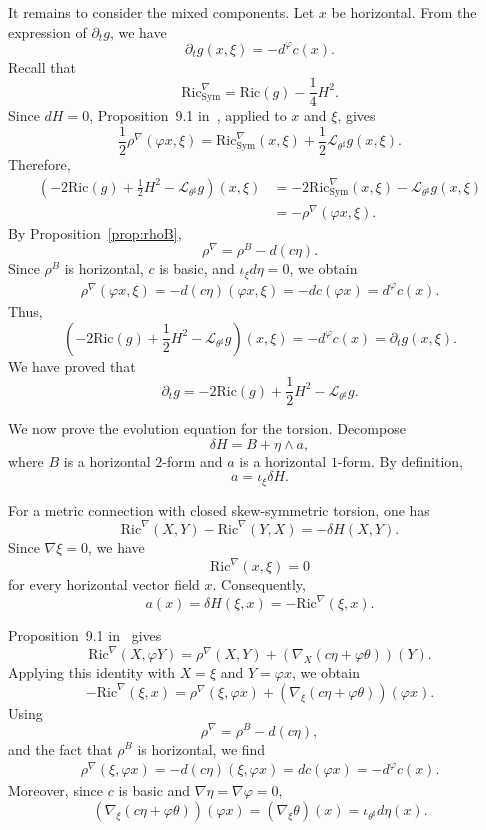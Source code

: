 \documentclass{article}
\makeatletter
\renewenvironment{proof}[1][\proofname]{%
  \par\pushQED{\qed}%
  \normalfont\topsep6\p@\@plus6\p@\relax
  \trivlist
  \item[\hskip\labelsep
        \textbf{\textup{#1}}\@addpunct{.}]\ignorespaces
}{%
  \popQED\endtrivlist\@endpefalse
}
\theoremstyle{definition}
\newcommand{\Ric}{\mathrm{Ric}}
\renewcommand{\phi}{\varphi}
\numberwithin{equation}{section}
\makeatother
\begin{document}
\begin{proof}
It remains to consider the mixed components. Let $x$ be horizontal. From the expression of $\partial_tg$, we have
\[
\partial_tg(x,\xi)
=
-d^\phi c(x).
\]
Recall that
\[
\Ric^\nabla_{\mathrm{Sym}}
=
\Ric(g)-\frac14H^2.
\]
Since $dH=0$, Proposition~9.1 in~\cite{FI}, applied to $x$ and $\xi$, gives
\[
\frac12\rho^\nabla(\phi x,\xi)
=
\Ric^\nabla_{\mathrm{Sym}}(x,\xi)
+\frac12\mathcal L_{\theta^\sharp}g(x,\xi).
\]
Therefore,
\[
\begin{aligned}
\left(
-2\Ric(g)+\frac12H^2-\mathcal L_{\theta^\sharp}g
\right)(x,\xi)
&=
-2\Ric^\nabla_{\mathrm{Sym}}(x,\xi)
-\mathcal L_{\theta^\sharp}g(x,\xi)\\
&
=
-\rho^\nabla(\phi x,\xi).
\end{aligned}
\]
By Proposition~\ref{prop:rhoB},
\[
\rho^\nabla
=
\rho^B-d(c\eta).
\]
Since $\rho^B$ is horizontal, $c$ is basic, and $\iota_\xi d\eta=0$, we obtain
\[
\begin{aligned}
\rho^\nabla(\phi x,\xi)=
-d(c\eta)(\phi x,\xi)=
-dc(\phi x)=d^\phi c(x).
\end{aligned}
\]
Thus,
\[
\left(
-2\Ric(g)+\frac12H^2-\mathcal L_{\theta^\sharp}g
\right)(x,\xi)
=
-d^\phi c(x)
=
\partial_tg(x,\xi).
\]
We have proved that
\[
\partial_tg
=
-2\Ric(g)+\frac12H^2-\mathcal L_{\theta^\sharp}g.
\]

We now prove the evolution equation for the torsion. Decompose
\[
\delta H=B+\eta\wedge a,
\]
where $B$ is a horizontal $2$-form and $a$ is a horizontal $1$-form. By definition,
\[
a=\iota_\xi\delta H.
\]

For a metric connection with closed skew-symmetric torsion, one has
\[
\Ric^\nabla(X,Y)-\Ric^\nabla(Y,X)
=
-\delta H(X,Y).
\]
Since $\nabla\xi=0$, we have
\[
\Ric^\nabla(x,\xi)=0
\]
for every horizontal vector field $x$. Consequently,
\[
a(x)
=
\delta H(\xi,x)
=
-\Ric^\nabla(\xi,x).
\]

Proposition~9.1 in~\cite{FI} gives
\[
\Ric^\nabla(X,\phi Y)
=
\rho^\nabla(X,Y)
+
\left(\nabla_X(c\eta+\phi\theta)\right)(Y).
\]
Applying this identity with $X=\xi$ and $Y=\phi x$, we obtain
\[
-\Ric^\nabla(\xi,x)
=
\rho^\nabla(\xi,\phi x)
+
\left(\nabla_\xi(c\eta+\phi\theta)\right)(\phi x).
\]
Using
\[
\rho^\nabla=\rho^B-d(c\eta),
\]
and the fact that $\rho^B$ is horizontal, we find
\[
\begin{aligned}
\rho^\nabla(\xi,\phi x)
=-d(c\eta)(\xi,\phi x)=
dc(\phi x)=
-d^\phi c(x).
\end{aligned}
\]
Moreover, since $c$ is basic and $\nabla\eta=\nabla\phi=0$,
\[
\left(\nabla_\xi(c\eta+\phi\theta)\right)(\phi x)
=
(\nabla_\xi\theta)(x)= \iota_{\theta^\sharp}d\eta(x).
\]


\end{proof}
\end{document}
